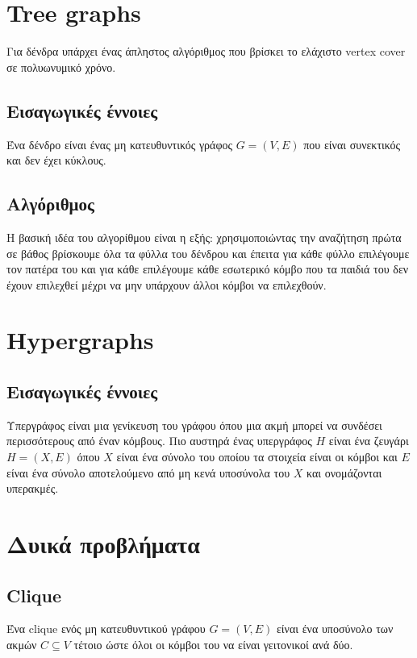 \section{Tree graphs}
Για δένδρα υπάρχει ένας άπληστος αλγόριθμος που βρίσκει το ελάχιστο vertex cover σε πολυωνυμικό χρόνο.

\subsection{Εισαγωγικές έννοιες}
Ένα δένδρο είναι ένας μη κατευθυντικός γράφος $G=(V,E)$ που είναι συνεκτικός και δεν έχει κύκλους.

\subsection{Αλγόριθμος}
Η βασική ιδέα του αλγορίθμου είναι η εξής: χρησιμοποιώντας την αναζήτηση πρώτα σε βάθος βρίσκουμε όλα τα φύλλα του δένδρου και έπειτα για κάθε φύλλο επιλέγουμε τον πατέρα του και για κάθε επιλέγουμε κάθε εσωτερικό κόμβο που τα παιδιά του δεν έχουν επιλεχθεί μέχρι να μην υπάρχουν άλλοι κόμβοι να επιλεχθούν.

\section{Hypergraphs}
\subsection{Εισαγωγικές έννοιες}
Υπεργράφος είναι μια γενίκευση του γράφου όπου μια ακμή μπορεί να συνδέσει περισσότερους από έναν κόμβους. Πιο αυστηρά ένας υπεργράφος $H$ είναι ένα ζευγάρι $H=(X,E)$ όπου $X$ είναι ένα σύνολο του οποίου τα στοιχεία είναι οι κόμβοι και $E$ είναι ένα σύνολο αποτελούμενο από μη κενά υποσύνολα του $X$ και ονομάζονται υπερακμές. 


\section{Δυικά προβλήματα}

\subsection{Clique}
Ένα clique ενός μη κατευθυντικού γράφου $G=(V,E)$ είναι ένα υποσύνολο των ακμών $C \subseteq V$ τέτοιο ώστε όλοι οι κόμβοι του να είναι γειτονικοί ανά δύο.\\
\\

